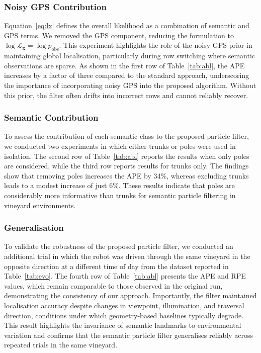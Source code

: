 \documentclass[letterpaper, 10 pt, conference]{ieeeconf}
\begin{document}
\subsubsection{Noisy GPS Contribution}
Equation~\ref{eq:lx} defines the overall likelihood as a combination of semantic and GPS terms. We removed the GPS component, reducing the formulation to $\log \mathcal{L}_\mathbf{x} = \log p_{\text{obs}}$. This experiment highlights the role of the noisy GPS prior in maintaining global localisation, particularly during row switching where semantic observations are sparse. As shown in the first row of Table~\ref{tab:abl}, the APE increases by a factor of three compared to the standard approach, underscoring the importance of incorporating noisy GPS into the proposed algorithm. Without this prior, the filter often drifts into incorrect rows and cannot reliably recover.

\subsubsection{Semantic Contribution}
To assess the contribution of each semantic class to the proposed particle filter, we conducted two experiments in which either trunks or poles were used in isolation. The second row of Table~\ref{tab:abl} reports the results when only poles are considered, while the third row reports results for trunks only. The findings show that removing poles increases the APE by 34\%, whereas excluding trunks leads to a modest increase of just 6\%. These results indicate that poles are considerably more informative than trunks for semantic particle filtering in vineyard environments.

\subsubsection{Generalisation}
To validate the robustness of the proposed particle filter, we conducted an additional trial in which the robot was driven through the same vineyard in the opposite direction at a different time of day from the dataset reported in Table~\ref{tab:evo}. The fourth row of Table~\ref{tab:abl} presents the APE and RPE values, which remain comparable to those observed in the original run, demonstrating the consistency of our approach. Importantly, the filter maintained localisation accuracy despite changes in viewpoint, illumination, and traversal direction, conditions under which geometry-based baselines typically degrade. This result highlights the invariance of semantic landmarks to environmental variation and confirms that the semantic particle filter generalises reliably across repeated trials in the same vineyard.
\end{document}
